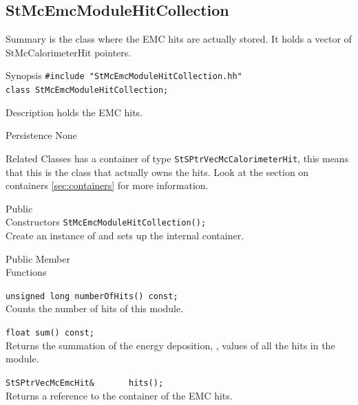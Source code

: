 \subsection{StMcEmcModuleHitCollection}
 
\label{sec:StMcEmcModuleHitCollection}
\begin{Entry}
\item[Summary]
     is the class where the EMC hits
    are actually stored.  It holds a vector of StMcCalorimeterHit pointers.

\item[Synopsis]
    \verb+#include "StMcEmcModuleHitCollection.hh"+\\
    \verb+class StMcEmcModuleHitCollection;+\\

\item[Description]
     holds the EMC hits.

\item[Persistence]
    None

\item[Related Classes]
    has a container of type {\tt StSPtrVecMcCalorimeterHit}, this means
    that this is the class that actually owns the hits.  Look
    at the section on containers \ref{sec:containers} for more
    information.    
\item[Public\\ Constructors]
    \verb+StMcEmcModuleHitCollection();+\\
    Create an instance of 
    and sets up the internal container.

\item[Public Member\\ Functions]

    \verb+unsigned long numberOfHits() const;+\\
    Counts the number of hits of this module.

    \verb+float sum() const;+\\
    Returns the summation of the energy deposition, , values
    of all the hits in the module.

    \verb+StSPtrVecMcEmcHit&       hits();+\\
    Returns a reference to the container of the EMC hits.


\end{Entry}
